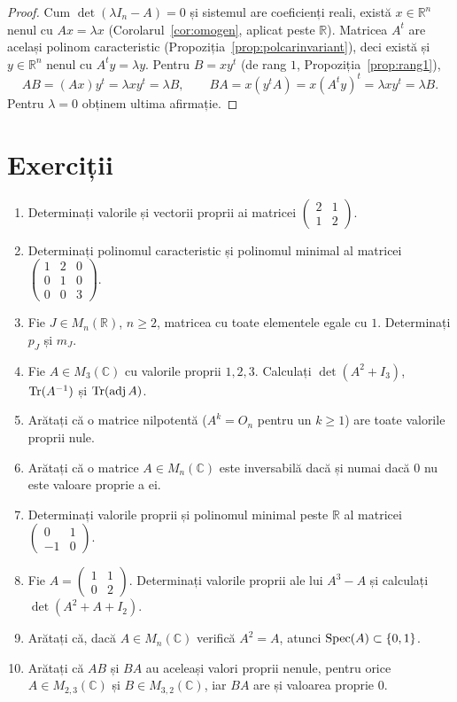 \begin{proof}
Cum $\det(\lambda I_n-A)=0$ și sistemul are coeficienți reali, există $x\in\mathbb{R}^n$ nenul cu $Ax=\lambda x$ (Corolarul~\ref{cor:omogen}, aplicat peste $\mathbb{R}$). Matricea $A^t$ are același polinom caracteristic (Propoziția~\ref{prop:polcarinvariant}), deci există și $y\in\mathbb{R}^n$ nenul cu $A^ty=\lambda y$. Pentru $B=xy^t$ (de rang $1$, Propoziția~\ref{prop:rang1}),
\[
AB=(Ax)y^t=\lambda xy^t=\lambda B,\qquad BA=x(y^tA)=x(A^ty)^t=\lambda xy^t=\lambda B.
\]
Pentru $\lambda=0$ obținem ultima afirmație.
\end{proof}

\section{Exerciții}

\begin{enumerate}[label=\textbf{\arabic*.},leftmargin=*]
\item Determinați valorile și vectorii proprii ai matricei $\begin{pmatrix}2&1\\1&2\end{pmatrix}$.
\item Determinați polinomul caracteristic și polinomul minimal al matricei $\begin{pmatrix}1&2&0\\0&1&0\\0&0&3\end{pmatrix}$.
\item Fie $J\in M_n(\mathbb{R})$, $n\ge2$, matricea cu toate elementele egale cu $1$. Determinați $p_J$ și $m_J$.
\item Fie $A\in M_3(\mathbb{C})$ cu valorile proprii $1,2,3$. Calculați $\det(A^2+I_3)$, $\operatorname{Tr}(A^{-1})$ și $\operatorname{Tr}(\operatorname{adj} A)$.
\item Arătați că o matrice nilpotentă ($A^k=O_n$ pentru un $k\ge1$) are toate valorile proprii nule.
\item Arătați că o matrice $A\in M_n(\mathbb{C})$ este inversabilă dacă și numai dacă $0$ nu este valoare proprie a ei.
\item Determinați valorile proprii și polinomul minimal peste $\mathbb{R}$ al matricei $\begin{pmatrix}0&1\\-1&0\end{pmatrix}$.
\item Fie $A=\begin{pmatrix}1&1\\0&2\end{pmatrix}$. Determinați valorile proprii ale lui $A^3-A$ și calculați $\det(A^2+A+I_2)$.
\item Arătați că, dacă $A\in M_n(\mathbb{C})$ verifică $A^2=A$, atunci $\operatorname{Spec}(A)\subset\{0,1\}$.
\item Arătați că $AB$ și $BA$ au aceleași valori proprii nenule, pentru orice $A\in M_{2,3}(\mathbb{C})$ și $B\in M_{3,2}(\mathbb{C})$, iar $BA$ are și valoarea proprie $0$.
\end{enumerate}

